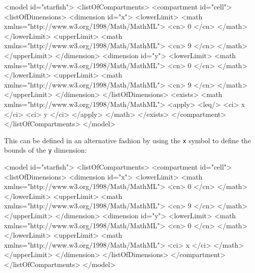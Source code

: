 \documentclass{cekarticle}
\begin{document}
\begin{example}
<model id="starfish">
    <listOfCompartments>
        <compartment id="cell">
            <listOfDimensions>
                <dimension id="x">
                    <lowerLimit>
                        <math xmlns="http://www.w3.org/1998/Math/MathML">
                            <cn> 0 </cn>
                        </math>
                    </lowerLimit>
                    <upperLimit>
                        <math xmlns="http://www.w3.org/1998/Math/MathML">
                            <cn> 9 </cn>
                        </math>
                    </upperLimit>
                </dimension>
                <dimension id="y">
                    <lowerLimit>
                        <math xmlns="http://www.w3.org/1998/Math/MathML">
                            <cn> 0 </cn>
                        </math>
                    </lowerLimit>
                    <upperLimit>
                        <math xmlns="http://www.w3.org/1998/Math/MathML">
                            <cn> 9 </cn>
                        </math>
                    </upperLimit>
                </dimension>
            </listOfDimensions>
            <exists>
                <math xmlns="http://www.w3.org/1998/Math/MathML">
                    <apply>
                        <leq/>
                        <ci> x </ci>
                        <ci> y </ci>
                    </apply>
                </math>
            </exists>
        </compartment>
    </listOfCompartments>
</model>
\end{example}

This can be defined in an alternative fashion by using the \texttt{x} symbol to define the bounds of the \texttt{y} dimension:
\begin{example}
<model id="starfish">
    <listOfCompartments>
        <compartment id="cell">
            <listOfDimensions>
                <dimension id="x">
                    <lowerLimit>
                        <math xmlns="http://www.w3.org/1998/Math/MathML">
                            <cn> 0 </cn>
                        </math>
                    </lowerLimit>
                    <upperLimit>
                        <math xmlns="http://www.w3.org/1998/Math/MathML">
                            <cn> 9 </cn>
                        </math>
                    </upperLimit>
                </dimension>
                <dimension id="y">
                    <lowerLimit>
                        <math xmlns="http://www.w3.org/1998/Math/MathML">
                            <cn> 0 </cn>
                        </math>
                    </lowerLimit>
                    <upperLimit>
                        <math xmlns="http://www.w3.org/1998/Math/MathML">
                            <ci> x </ci>
                        </math>
                    </upperLimit>
                </dimension>
            </listOfDimensions>
        </compartment>
    </listOfCompartments>
</model>
\end{example}
\end{document}
